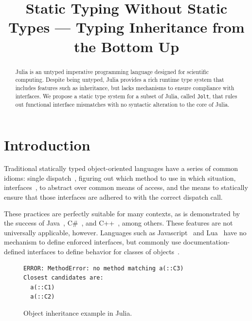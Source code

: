 \documentclass[preprint]{sigplanconf}
\newcommand{\xt}[1]{\texttt{#1}}
\newcommand{\jolt}{\xt{Jolt}}
\begin{document}
\title{Static Typing Without Static Types --- Typing Inheritance from the Bottom Up} 
\maketitle

\begin{abstract}
Julia is an untyped imperative programming language designed for scientific computing. 
Despite being untyped, Julia provides a rich runtime type system that includes features such as  
inheritance, but lacks mechanisms to ensure compliance with interfaces.
We propose a static type system for a subset of Julia, called \jolt, that rules out functional interface mismatches
with no syntactic alteration to the core of Julia.
\end{abstract}


\section{Introduction}

Traditional statically typed object-oriented languages have a series of
common idioms: single dispatch~\cite{jls}, figuring out which method
to use in which situation, interfaces~\cite{objinter, fj}, to abstract over 
common means of access, and the means to statically
ensure that those interfaces are adhered to with the correct dispatch call.

These practices are perfectly suitable for many contexts,
as is demonstrated by the success of Java~\cite{jls}, C\#~\cite{csls}, and C++~\cite{cppls}, among others.
These features are not universally applicable, however. Languages such as 
Javascript~\cite{ecma} and Lua~\cite{lualang} have no mechanism to define enforced
interfaces, but commonly use documentation-defined interfaces to define behavior
for classes of objects~\cite{lualang}.

\begin{figure}[h]


\begin{Verbatim}[fontsize=\scriptsize]
ERROR: MethodError: no method matching a(::C3)
Closest candidates are:
  a(::C1)
  a(::C2)
\end{Verbatim}
\caption{Object inheritance example in Julia.}
\label{code:broken}
\end{figure}
\end{document}
